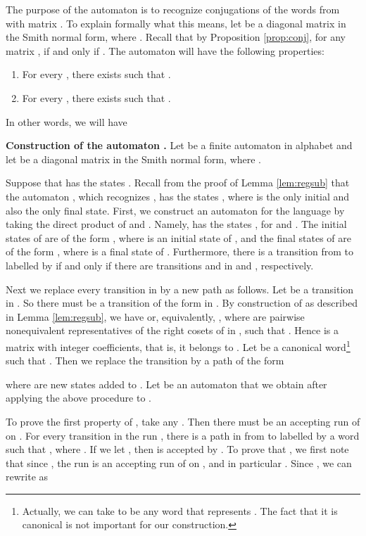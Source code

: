 \documentclass[fontsize=11pt,DIV=13,paper=letter]{scrartcl}
\theoremstyle{definition}
\begin{document}
\medskip
The purpose of the automaton  is to recognize conjugations of the words from  with matrix . To explain formally what this means, let  be a diagonal matrix in the Smith normal form, where . Recall that by Proposition \ref{prop:conj}, for any matrix ,  if and only if .
The automaton  will have the following properties:
\begin{enumerate}[(1)]
\item For every , there exists  such that .
\item For every , there exists  such that .
\end{enumerate}
In other words, we will have


{\bf Construction of the automaton .} Let  be a finite automaton in alphabet  and let  be a diagonal matrix in the Smith normal form, where .

Suppose that  has the states . Recall from the proof of Lemma \ref{lem:regsub} that the automaton , which recognizes , has the states , where  is the only initial and also the only final state. First, we construct an automaton  for the language  by taking the direct product of  and . Namely,  has the states , for  and . The initial states of  are of the form , where  is an initial state of , and the final states of  are of the form , where  is a final state of . Furthermore, there is a transition from  to  labelled by  if and only if there are transitions  and  in  and , respectively.

Next we replace every transition in  by a new path as follows. Let  be a transition in . So there must be a transition of the form  in . By construction of  as described in Lemma \ref{lem:regsub}, we have  or, equivalently, , where  are pairwise nonequivalent representatives of the right cosets of  in , such that . Hence  is a matrix with integer coefficients, that is, it belongs to . Let  be a canonical word\footnote{Actually, we can take  to be any word that represents . The fact that it is canonical is not important for our construction.} such that . Then we replace the transition  by a path of the form

where  are new states added to . Let  be an automaton that we obtain after applying the above procedure to .



To prove the first property of , take any . Then there must be an accepting run  of  on . For every transition  in the run , there is a path in  from  to  labelled by a word  such that , where . If we let , then  is accepted by . To prove that , we first note that since , the run  is an accepting run of  on , and in particular . Since , we can rewrite  as
\end{document}
